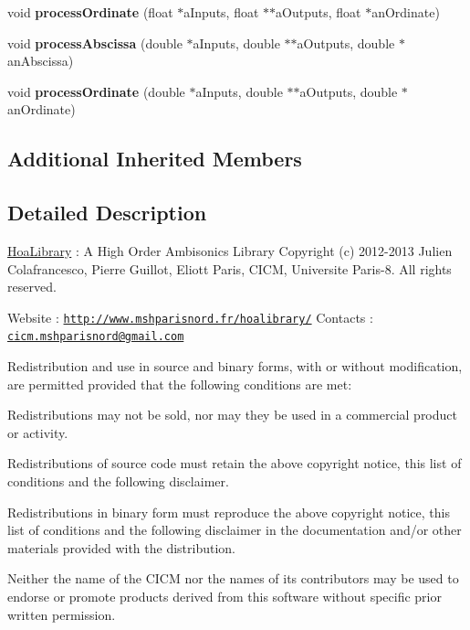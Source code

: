 \begin{DoxyCompactItemize}
\item 
\hypertarget{class_ambisonics_multi_maps_a99e786c532d9bfeabf0a9a0d5998ea72}{void {\bfseries process\-Ordinate} (float $\ast$a\-Inputs, float $\ast$$\ast$a\-Outputs, float $\ast$an\-Ordinate)}\label{class_ambisonics_multi_maps_a99e786c532d9bfeabf0a9a0d5998ea72}

\item 
\hypertarget{class_ambisonics_multi_maps_a02dc73d518ccf8da9f584a3d89705193}{void {\bfseries process\-Abscissa} (double $\ast$a\-Inputs, double $\ast$$\ast$a\-Outputs, double $\ast$an\-Abscissa)}\label{class_ambisonics_multi_maps_a02dc73d518ccf8da9f584a3d89705193}

\item 
\hypertarget{class_ambisonics_multi_maps_a0e73b65563ac00923c44f12c16d55592}{void {\bfseries process\-Ordinate} (double $\ast$a\-Inputs, double $\ast$$\ast$a\-Outputs, double $\ast$an\-Ordinate)}\label{class_ambisonics_multi_maps_a0e73b65563ac00923c44f12c16d55592}

\end{DoxyCompactItemize}
\subsection*{Additional Inherited Members}


\subsection{Detailed Description}
\hyperlink{interface_hoa_library}{Hoa\-Library} \-: A High Order Ambisonics Library Copyright (c) 2012-\/2013 Julien Colafrancesco, Pierre Guillot, Eliott Paris, C\-I\-C\-M, Universite Paris-\/8. All rights reserved.

Website \-: \href{http://www.mshparisnord.fr/hoalibrary/}{\tt http\-://www.\-mshparisnord.\-fr/hoalibrary/} Contacts \-: \href{mailto:cicm.mshparisnord@gmail.com}{\tt cicm.\-mshparisnord@gmail.\-com}

Redistribution and use in source and binary forms, with or without modification, are permitted provided that the following conditions are met\-:


\begin{DoxyItemize}
\item Redistributions may not be sold, nor may they be used in a commercial product or activity.
\item Redistributions of source code must retain the above copyright notice, this list of conditions and the following disclaimer.
\item Redistributions in binary form must reproduce the above copyright notice, this list of conditions and the following disclaimer in the documentation and/or other materials provided with the distribution.
\item Neither the name of the C\-I\-C\-M nor the names of its contributors may be used to endorse or promote products derived from this software without specific prior written permission.
\end{DoxyItemize}

